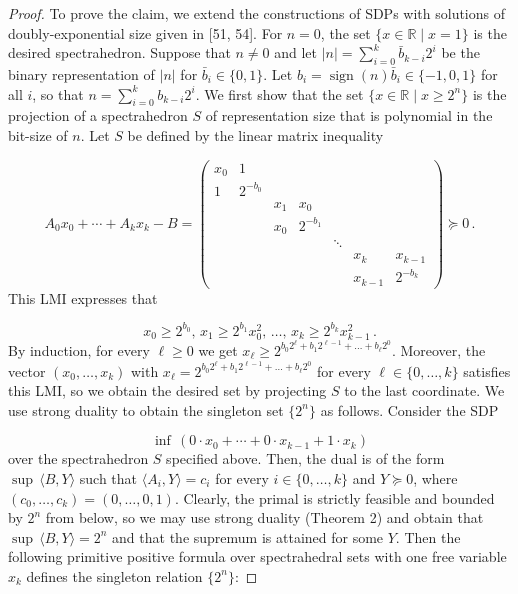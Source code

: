 \documentclass[10pt,a4paper]{article}
\theoremstyle{definition}
\begin{document}
\begin{proof}
To prove the claim, we extend the constructions of SDPs with solutions of doubly-exponential size given in [51, 54]. For $n=0$, the set $\{x\in\mathbb{R}\mid x=1\}$ is the desired spectrahedron. Suppose that $n\neq 0$ and let $|n|=\sum_{i=0}^{k}\bar{b}_{k-i}2^{i}$ be the binary representation of $|n|$ for $\bar{b}_{i}\in\{0,1\}$. Let $b_{i}=\operatorname*{\mathrm{sign}}(n)\bar{b}_{i}\in\{-1,0,1\}$ for all $i$, so that $n=\sum_{i=0}^{k}b_{k-i}2^{i}$. We first show that the set $\{x\in{\mathbb{R}}\mid x\geq 2^{n}\}$ is the projection of a spectrahedron $S$ of representation size that is polynomial in the bit-size of $n$. Let $S$ be defined by the linear matrix inequality


\[
\displaystyle A_{0}x_{0}+\cdots+A_{k}x_{k}-B=\begin{pmatrix}x_{0}&1&\\ 1&2^{-b_{0}}\\ &&x_{1}&x_{0}\\ &&x_{0}&2^{-b_{1}}\\ &&&&\ddots\\ &&&&&x_{k}&x_{k-1}\\ &&&&&x_{k-1}&2^{-b_{k}}\end{pmatrix}\succeq 0\,.
\]
This LMI expresses that


\[
x_{0}\geq 2^{b_{0}},\,x_{1}\geq 2^{b_{1}}x_{0}^{2},\,\dots,\,x_{k}\geq 2^{b_{k}}x_{k-1}^{2}\,.
\]
By induction, for every $\ell\geq 0$ we get $x_{\ell}\geq 2^{b_{0}2^{\ell}+b_{1}2^{\ell-1}+\dots+b_{\ell}2^{0}}$. Moreover, the vector $(x_{0},\dots,x_{k})$ with $x_{\ell}=2^{b_{0}2^{\ell}+b_{1}2^{\ell-1}+\dots+b_{\ell}2^{0}}$ for every $\ell\in\{0,\dots,k\}$ satisfies this LMI, so we obtain the desired set by projecting $S$ to the last coordinate. We use strong duality to obtain the singleton set $\{2^{n}\}$ as follows. Consider the SDP


\[
\inf\,(0\cdot x_{0}+\cdots+0\cdot x_{k-1}+1\cdot x_{k})
\]
over the spectrahedron $S$ specified above. Then, the dual is of the form $\sup\,\langle B,Y\rangle$ such that $\langle A_{i},Y\rangle=c_{i}$ for every $i\in\{0,\dots,k\}$ and $Y\succeq 0$, where $(c_{0},\dots,c_{k})=(0,\dots,0,1)$. Clearly, the primal is strictly feasible and bounded by $2^{n}$ from below, so we may use strong duality (Theorem 2) and obtain that $\sup\,\langle B,Y\rangle=2^{n}$ and that the supremum is attained for some $Y$. Then the following primitive positive formula over spectrahedral sets with one free variable $x_{k}$ defines the singleton relation $\{2^{n}\}$:



\end{proof}
\end{document}
